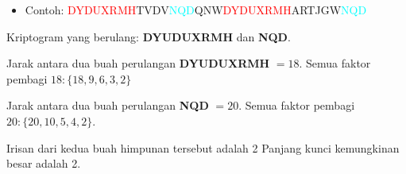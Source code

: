 \documentclass{article}
\begin{document}

\begin{itemize}
  \item Contoh:
  \vspace{5mm}
  \textcolor{red}{DYDUXRMH}TVDV\textcolor{cyan}{NQD}QNW\textcolor{red}{DYDUXRMH}ARTJGW\textcolor{cyan}{NQD}
\end{itemize}

Kriptogram yang berulang: \textbf{DYUDUXRMH} dan \textbf{NQD}.

Jarak antara dua buah perulangan \textbf{DYUDUXRMH} $= 18$.
Semua faktor pembagi $18 : \{18, 9, 6, 3, 2\}$

Jarak antara dua buah perulangan \textbf{NQD} $= 20$.
Semua faktor pembagi $20 : \{20, 10, 5, 4, 2\}$.

Irisan dari kedua buah himpunan tersebut adalah 2
Panjang kunci kemungkinan besar adalah 2.
\end{document}
